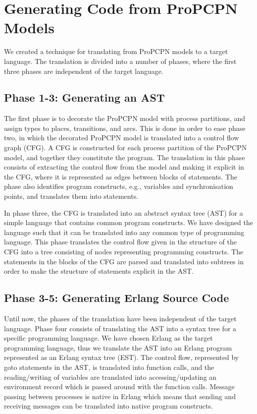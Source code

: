 \section{Generating Code from ProPCPN Models}
We created a technique for translating from ProPCPN models to a target language. The translation is divided into a number of phases, where the first three phases are independent of the target language. 

\subsection{Phase 1-3: Generating an AST}
The first phase is to decorate the ProPCPN model with process partitions, and assign types to places, transitions, and arcs. This is done in order to ease phase two, in which the decorated ProPCPN model is translated into a control flow graph (CFG). A CFG is constructed for each process partition of the ProPCPN model, and together they constitute the program. The translation in this phase consists of extracting the control flow from the model and making it explicit in the CFG, where it is represented as edges between blocks of statements. The phase also identifies program constructs, e.g., variables and synchronisation points, and translates them into statements. 

In phase three, the CFG is translated into an abstract syntax tree (AST) for a simple language that contains common program constructs. We have designed the language such that it can be translated into any common type of programming language. This phase translates the control flow given in the structure of the CFG into a tree consisting of nodes representing programming constructs. The statements in the blocks of the CFG are parsed and translated into subtrees in order to make the structure of statements explicit in the AST.

\subsection{Phase 3-5: Generating Erlang Source Code}
Until now, the phases of the translation have been independent of the target language. Phase four consists of translating the AST into a syntax tree for a specific programming language. We have chosen Erlang as the target programming language, thus we translate the AST into an Erlang program represented as an Erlang syntax tree (EST). The control flow, represented by goto statements in the AST, is translated into function calls, and the reading/writing of variables are translated into accessing/updating an environment record which is passed around with the function calls. Message passing between processes is native in Erlang which means that sending and receiving messages can be translated into native program constructs. 

